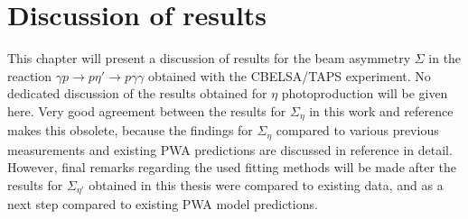 \chapter{Discussion of results}
This chapter will present a discussion of results for the beam asymmetry $\Sigma$ in the reaction $\gamma p \to p\eta'\to p\gamma\gamma$ obtained with the CBELSA/TAPS experiment. No dedicated discussion of the results obtained for $\eta$ photoproduction will be given here. Very good agreement between the results for $\Sigma_\eta$ in this work and reference \cite{farahphd} makes this obsolete, because the findings for $\Sigma_\eta$ compared to various previous measurements and existing PWA predictions are discussed in reference \cite{farahphd} in detail. However, final remarks regarding the used fitting methods will be made after the results for $\Sigma_{\eta'}$ obtained in this thesis were compared to existing data, and as a next step compared to existing PWA model predictions. 

